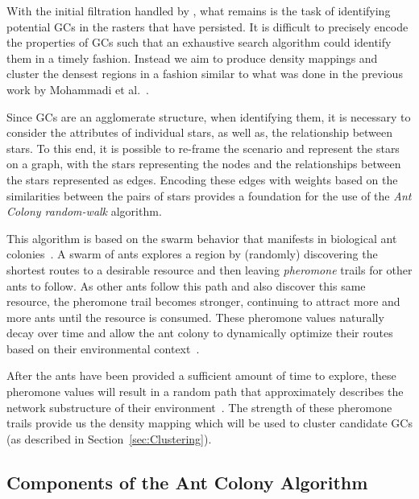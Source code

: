 With the initial filtration handled by \blobdog{}, what remains is the task of identifying potential GCs in the rasters that have persisted. It is difficult to precisely encode the properties of GCs such that an exhaustive search algorithm could identify them in a timely fashion. Instead we aim to produce density mappings and cluster the densest regions in a fashion similar to what was done in the previous work by Mohammadi et al.~\cite{Mohammadi}.

Since GCs are an agglomerate structure, when identifying them, it is necessary to consider the attributes of individual stars, as well as, the relationship between stars. To this end, it is possible to re-frame the scenario and represent the stars on a graph, with the stars representing the nodes and the relationships between the stars represented as edges. Encoding these edges with weights based on the similarities between the pairs of stars provides a foundation for the use of the \textit{Ant Colony random-walk} algorithm.

This algorithm is based on the swarm behavior that manifests in biological ant colonies~\cite{AntColony}. A swarm of ants explores a region by (randomly) discovering the shortest routes to a desirable resource and then leaving \textit{pheromone} trails for other ants to follow. As other ants follow this path and also discover this same resource, the pheromone trail becomes stronger, continuing to attract more and more ants until the resource is consumed. These pheromone values naturally decay over time and allow the ant colony to dynamically optimize their routes based on their environmental context~\cite{AntColony}.

After the ants have been provided a sufficient amount of time to explore, these pheromone values will result in a random path that approximately describes the network substructure of their environment~\cite{Xia2019}. The strength of these pheromone trails provide us the density mapping which will be used to cluster candidate GCs (as described in Section~\ref{sec:Clustering}).

\subsection{Components of the Ant Colony Algorithm}

